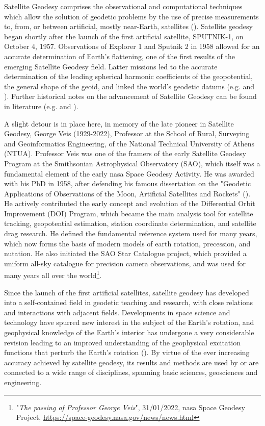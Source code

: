 Satellite Geodesy comprises the observational and computational techniques which allow
the solution of geodetic problems by the use of precise measurements to, from, or between
artificial, mostly near-Earth, satellites (\cite{Seeber2003}). Satellite geodesy began
shortly after the launch of the first artificial satellite, SPUTNIK-1, on October 4, 1957.
Observations of Explorer 1 and Sputnik 2 in 1958 allowed for an accurate determination of
Earth's flattening, one of the first results of the emerging Satellite Geodesy field. 
Latter missions led to the accurate determination of the leading
spherical harmonic coefficients of the geopotential, the general shape of the geoid,
and linked the world's geodetic datums (e.g. \cite{KingHele1958} and \cite{Merson1958}).
Further historical notes on the advancement of Satellite Geodesy can be found in literature 
(e.g. \cite{Seeber2003} and \cite{Barlier2001}).

A slight detour is in place here, in memory of the late pioneer in Satellite Geodesy, George Veis (1929-2022), 
Professor at the School of Rural, Surveying and Geoinformatics Engineering, of the National Technical 
University of Athens (NTUA). 
Professor Veis was one of the framers of the early Satellite Geodesy Program at the
Smithsonian Astrophysical Observatory (SAO), which itself was a fundamental element of
the early \gls{nasa} Space Geodesy Activity. He was awarded with his PhD in 1958,
after defending his famous dissertation on the "Geodetic Applications of Observations
of the Moon, Artificial Satellites and Rockets" (\cite{Veis1960}). He actively contributed the early
concept and evolution of the Differential Orbit Improvement (DOI) Program, which became
the main analysis tool for satellite tracking, geopotential estimation, station
coordinate determination, and satellite drag research. He defined the fundamental
reference system used for many years, which now forms the basis of modern models
of earth rotation, precession, and nutation. He also initiated the SAO Star Catalogue
project, which provided a uniform all-sky catalogue for precision camera observations,
and was used for many years all over the world\footnote{"\textit{The passing of Professor George Veis}",
31/01/2022, \gls{nasa} Space Geodesy Project, \url{https://space-geodesy.nasa.gov/news/news.html}}.

Since the launch of the first artificial satellites, satellite geodesy has developed into a
self-contained field in geodetic teaching and research, with close relations and interactions 
with adjacent fields. 
Developments in space science and technology have spurred new interest
in the subject of the Earth's rotation, and geophysical knowledge of the Earth's interior has
undergone a very considerable revision leading to an improved understanding of the
geophysical excitation functions that perturb the Earth's rotation (\cite{Lambeck1980}).
By virtue of the ever increasing accuracy achieved by satellite geodesy,
its results and methods are used by or are connected to a wide range of disciplines, spanning
basic sciences, geosciences and engineering.

